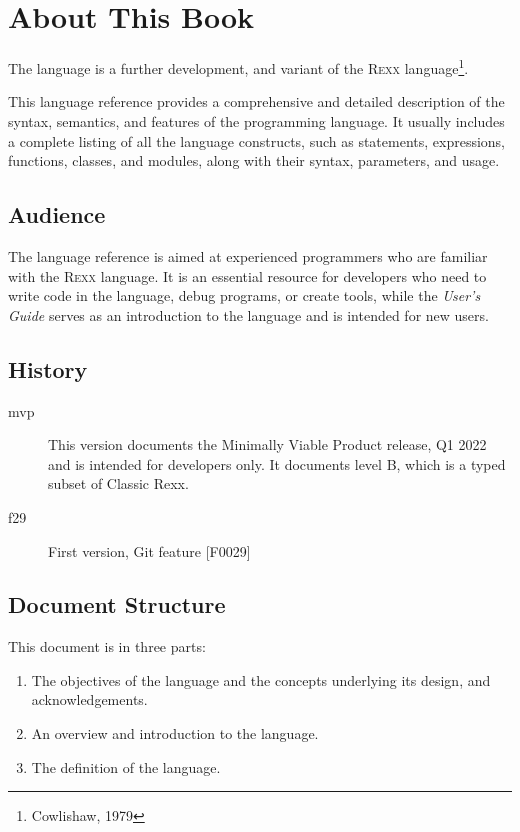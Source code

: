 \def\tightlist{}


\chapter*{About This Book}
The \crexx{} language is a further development, and variant of the
\textsc{Rexx} language\footnote{Cowlishaw, 1979}.

This language reference provides a comprehensive and detailed
description of the syntax, semantics, and features of the \crexx{}
programming language. It usually includes a complete listing of all
the language constructs, such as statements, expressions, functions,
classes, and modules, along with their syntax, parameters, and usage.

\section*{Audience}
The \crexx{} language reference is aimed at experienced programmers who
are familiar with the \textsc{Rexx} language. It is an
essential resource for developers who need to write code in the
language, debug programs, or create tools, while the \emph{\crexx{} User's Guide} serves as an introduction to
the language and is intended for new users.

\section*{History}

\begin{description}
\item[mvp] This version documents the Minimally Viable Product
  release, Q1 2022 and is intended for developers only. It documents \crexx{} level B, which is a typed
  subset of Classic Rexx.
\item[f29] First version, Git feature [F0029]
\end{description}

\section*{Document Structure}
This document is in three parts:
\begin{enumerate}
\item The objectives of the \crexx{} language and the concepts underlying its design, and acknowledgements.
\item An overview and introduction to the \crexx{} language.
\item The definition of the language.
\end{enumerate}

